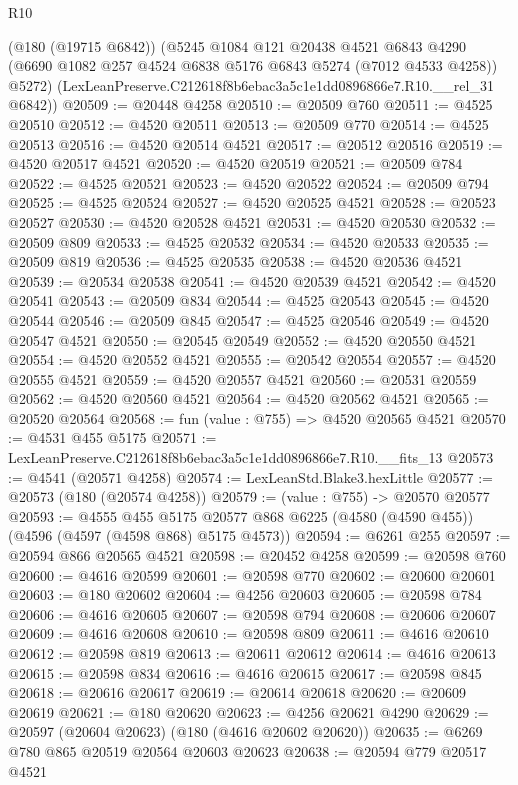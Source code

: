 \begin{lexlean}{R10}
\begin{coremodule}
      (@180 (@19715 @6842))
      (@5245
        @1084
        @121
        @20438
        @4521
        @6843
        @4290
        (@6690 @1082 @257 @4524 @6838 @5176 @6843 @5274 (@7012 @4533 @4258))
        @5272)
      (LexLeanPreserve.C212618f8b6ebac3a5c1e1dd0896866e7.R10.__rel_31 @6842))
@20509 := @20448 @4258
@20510 := @20509 @760
@20511 := @4525 @20510
@20512 := @4520 @20511
@20513 := @20509 @770
@20514 := @4525 @20513
@20516 := @4520 @20514 @4521
@20517 := @20512 @20516
@20519 := @4520 @20517 @4521
@20520 := @4520 @20519
@20521 := @20509 @784
@20522 := @4525 @20521
@20523 := @4520 @20522
@20524 := @20509 @794
@20525 := @4525 @20524
@20527 := @4520 @20525 @4521
@20528 := @20523 @20527
@20530 := @4520 @20528 @4521
@20531 := @4520 @20530
@20532 := @20509 @809
@20533 := @4525 @20532
@20534 := @4520 @20533
@20535 := @20509 @819
@20536 := @4525 @20535
@20538 := @4520 @20536 @4521
@20539 := @20534 @20538
@20541 := @4520 @20539 @4521
@20542 := @4520 @20541
@20543 := @20509 @834
@20544 := @4525 @20543
@20545 := @4520 @20544
@20546 := @20509 @845
@20547 := @4525 @20546
@20549 := @4520 @20547 @4521
@20550 := @20545 @20549
@20552 := @4520 @20550 @4521
@20554 := @4520 @20552 @4521
@20555 := @20542 @20554
@20557 := @4520 @20555 @4521
@20559 := @4520 @20557 @4521
@20560 := @20531 @20559
@20562 := @4520 @20560 @4521
@20564 := @4520 @20562 @4521
@20565 := @20520 @20564
@20568 := fun (value : @755) => @4520 @20565 @4521
@20570 := @4531 @455 @5175
@20571 := LexLeanPreserve.C212618f8b6ebac3a5c1e1dd0896866e7.R10.__fits_13
@20573 := @4541 (@20571 @4258)
@20574 := LexLeanStd.Blake3.hexLittle
@20577 := @20573 (@180 (@20574 @4258))
@20579 := (value : @755) -> @20570 @20577
@20593 := @4555
    @455
    @5175
    @20577
    @868
    @6225
    (@4580 (@4590 @455))
    (@4596 (@4597 (@4598 @868) @5175 @4573))
@20594 := @6261 @255
@20597 := @20594 @866 @20565 @4521
@20598 := @20452 @4258
@20599 := @20598 @760
@20600 := @4616 @20599
@20601 := @20598 @770
@20602 := @20600 @20601
@20603 := @180 @20602
@20604 := @4256 @20603
@20605 := @20598 @784
@20606 := @4616 @20605
@20607 := @20598 @794
@20608 := @20606 @20607
@20609 := @4616 @20608
@20610 := @20598 @809
@20611 := @4616 @20610
@20612 := @20598 @819
@20613 := @20611 @20612
@20614 := @4616 @20613
@20615 := @20598 @834
@20616 := @4616 @20615
@20617 := @20598 @845
@20618 := @20616 @20617
@20619 := @20614 @20618
@20620 := @20609 @20619
@20621 := @180 @20620
@20623 := @4256 @20621 @4290
@20629 := @20597 (@20604 @20623) (@180 (@4616 @20602 @20620))
@20635 := @6269 @780 @865 @20519 @20564 @20603 @20623
@20638 := @20594 @779 @20517 @4521

\end{coremodule}
\end{lexlean}
